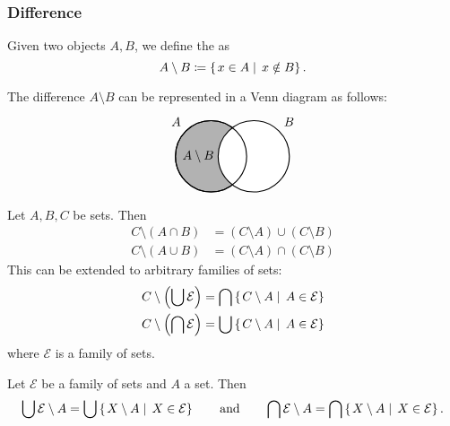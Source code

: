 \subsubsection{Difference}
\begin{definition}
Given two objects $A,B$, we define the  as
\[A\setminus B \coloneqq \left\{\left.  x\in A \;\right|\; x\notin B \right\}. \]
\end{definition}
The difference $A\setminus B$ can be represented in a Venn diagram as follows:
\[ \begin{tikzpicture}[thick,
    set/.style = {circle,
        minimum size = 2cm}]

\node[set,draw,fill=black!30,label={135:$A$}] (A) at (0,0) {};

\node[set,draw,fill=white,label={45:$B$}] (B) at (1.2,0) {};

\draw (0,0) circle(1cm);

\node at (-0.36,0) {$A\setminus B$};
\end{tikzpicture} \]

\begin{proposition}
Let $A,B,C$ be sets. Then
\begin{align*}
C\setminus (A\cap B) &= (C\setminus A)\cup(C\setminus B) \\
C\setminus (A\cup B) &= (C\setminus A)\cap(C\setminus B)
\end{align*}
This can be extended to arbitrary families of sets:
\begin{align*}
C\setminus\left(\bigcup \mathcal{E}\right) &= \bigcap\left\{\left. C\setminus A \;\right|\; A\in\mathcal{E} \right\} \\
C\setminus\left(\bigcap \mathcal{E}\right) &= \bigcup\left\{\left. C\setminus A \;\right|\; A\in\mathcal{E} \right\}
\end{align*}
where $\mathcal{E}$ is a family of sets.
\end{proposition}
\begin{lemma}
Let $\mathcal{E}$ be a family of sets and $A$ a set. Then
\[ \bigcup \mathcal{E} \setminus A = \bigcup\left\{\left. X\setminus A \;\right|\; X\in\mathcal{E} \right\} \qquad\text{and}\qquad \bigcap \mathcal{E} \setminus A = \bigcap\left\{\left. X\setminus A \;\right|\; X\in\mathcal{E} \right\}. \]
\end{lemma}

